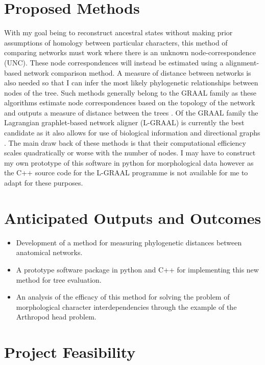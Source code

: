\documentclass[fontsize=11pt]{scrartcl}\usepackage[]{graphicx}\usepackage[]{color}
\begin{document}
  \section{Proposed Methods}
  With my goal being to reconstruct ancestral states without making prior assumptions of homology between particular characters, this method of comparing networks must work 
  where there is an unknown node-correspondence (UNC). These node correspondences will instead be estimated using a alignment-based network comparison method. 
  A measure of distance between networks is also needed so that I can infer the most likely phylogenetic relationships between nodes of the tree. 
  Such methods generally belong to the GRAAL family as these algorithms estimate node correspondences based on the topology of the network and outputs a 
  measure of distance between the trees \cite{Tantardini2019}.
  Of the GRAAL family the Lagrangian graphlet-based network aligner (L-GRAAL) is currently the best candidate as it also allows for use of biological information and directional graphs \cite{Malod-Dognin2015}. 
  The main draw back of these methods is that their computational efficiency scales quadratically or worse with the number of nodes. I may have to construct my own prototype of this software in python
  for morphological data however as the C++ source code for the L-GRAAL programme is not available for me to adapt for these purposes.
 
  \section{Anticipated Outputs and Outcomes}
  \begin{itemize}
    \item Development of a method for measuring phylogenetic distances between anatomical networks.
    \item A prototype software package in python and C++ for implementing this new method for tree evaluation.
    \item An analysis of the efficacy of this method for solving the problem of morphological character interdependencies through the example of the Arthropod head problem.
  \end{itemize}

  \section{Project Feasibility}

    
\end{document}
